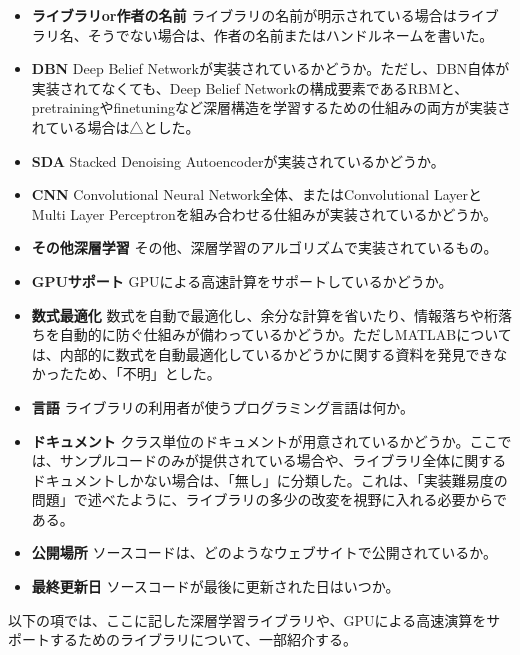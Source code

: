 \begin{itemize}
\item \textbf{ライブラリor作者の名前} ライブラリの名前が明示されている場合はライブラリ名、そうでない場合は、作者の名前またはハンドルネームを書いた。
\item \textbf{DBN} Deep Belief Networkが実装されているかどうか。ただし、DBN自体が実装されてなくても、Deep Belief Networkの構成要素であるRBMと、pretrainingやfinetuningなど深層構造を学習するための仕組みの両方が実装されている場合は△とした。
\item \textbf{SDA} Stacked Denoising Autoencoderが実装されているかどうか。
\item \textbf{CNN} Convolutional Neural Network全体、またはConvolutional LayerとMulti Layer Perceptronを組み合わせる仕組みが実装されているかどうか。
\item \textbf{その他深層学習} その他、深層学習のアルゴリズムで実装されているもの。%
\item \textbf{GPUサポート} GPUによる高速計算をサポートしているかどうか。
\item \textbf{数式最適化} 数式を自動で最適化し、余分な計算を省いたり、情報落ちや桁落ちを自動的に防ぐ仕組みが備わっているかどうか。ただしMATLABについては、内部的に数式を自動最適化しているかどうかに関する資料を発見できなかったため、「不明」とした。
\item \textbf{言語} ライブラリの利用者が使うプログラミング言語は何か。
\item \textbf{ドキュメント} クラス単位のドキュメントが用意されているかどうか。ここでは、サンプルコードのみが提供されている場合や、ライブラリ全体に関するドキュメントしかない場合は、「無し」に分類した。これは、「実装難易度の問題」で述べたように、ライブラリの多少の改変を視野に入れる必要からである。
\item \textbf{公開場所} ソースコードは、どのようなウェブサイトで公開されているか。
\item \textbf{最終更新日} ソースコードが最後に更新された日はいつか。
\end{itemize}

以下の項では、ここに記した深層学習ライブラリや、GPUによる高速演算をサポートするためのライブラリについて、一部紹介する。

